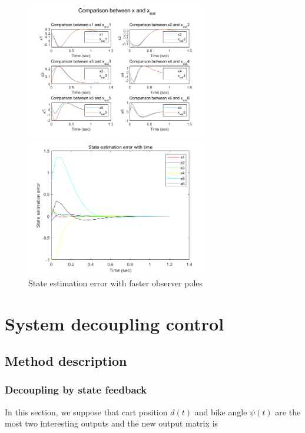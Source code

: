 \documentclass[hyperref]{article}
\theoremstyle{nonumberplain}
\begin{document}
	\begin{figure}[H]
		\centering
		\begin{minipage}[t]{0.48\textwidth}
			\centering
			\includegraphics[width=8cm]{fig28.png}
		\end{minipage}
		\begin{minipage}[t]{0.48\textwidth}
			\centering
			\includegraphics[width=8cm]{fig29.png}
		\end{minipage}
		\caption{State estimation error with faster observer poles}
		\label{fig20}
	\end{figure}
	
	\section{System decoupling control}
	
	\subsection{Method description}
	
	\subsubsection{Decoupling by state feedback}
	
	\hspace{1.0em}
	In this section, we suppose that cart position $d(t)$ and bike angle $\psi (t)$ are the most two interesting outputs and the new output matrix is
	
\end{document}
